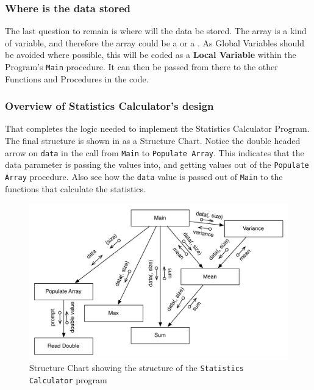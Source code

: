 

\subsubsection{Where is the data stored} %
\label{ssub:where_is_the_data_stored}

The last question to remain is where will the data be stored. The array is a kind of variable, and therefore the array could be a  or a . As Global Variables should be avoided where possible, this will be coded as a \textbf{Local Variable} within the Program's \texttt{Main} procedure. It can then be passed from there to the other Functions and Procedures in the code.


\clearpage
\subsubsection{Overview of Statistics Calculator's design} %
\label{ssub:overview_of_statistics_calculators_design}

That completes the logic needed to implement the Statistics Calculator Program. The final structure is shown in  as a Structure Chart. Notice the double headed arrow on \texttt{data} in the call from \texttt{Main} to \texttt{Populate Array}. This indicates that the data parameter is passing the values into, and getting values out of the \texttt{Populate Array} procedure. Also see how the \texttt{data} value is passed out of \texttt{Main} to the functions that calculate the statistics.

\begin{figure}[htbp]
   \centering
   \includegraphics[width=\textwidth]{./topics/arrays/diagrams/StatsCalcStruct} 
   \caption{Structure Chart showing the structure of the \texttt{Statistics Calculator} program}
   \label{fig:stats-calc-struct}
\end{figure}

